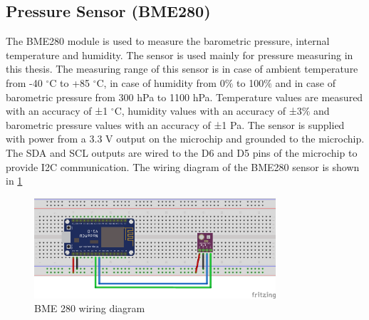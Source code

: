 \begin{itemize}

\end{itemize}


\subsection{Pressure Sensor (BME280)}

The BME280 \citep{BME280_Datasheet} module is used to measure the barometric pressure, internal temperature and humidity. The sensor is used mainly for pressure measuring in this thesis. The measuring range of this sensor is in case of ambient temperature from -40 $^{\circ}$C to +85 $^{\circ}$C, in case of humidity from 0$\%$ to 100$\%$ and in case of barometric pressure from 300 hPa to 1100 hPa. Temperature values are measured with an accuracy of ±1 $^{\circ}$C, humidity values with an accuracy of ±3$\%$ and barometric pressure values with an accuracy of ±1 Pa. The sensor is supplied with power from a 3.3 V output on the microchip and grounded to the microchip. The SDA and SCL outputs are wired to the D6 and D5 pins of the microchip to provide I2C communication. The wiring diagram of the BME280 sensor is shown in \cref{fig:bme280_schema}

\begin{figure}[H]
	\centering
	\includegraphics[width=0.8\textwidth]{img/bme280_schema.png}
	\caption{BME 280 wiring diagram}
	\label{fig:bme280_schema}
\end{figure}


